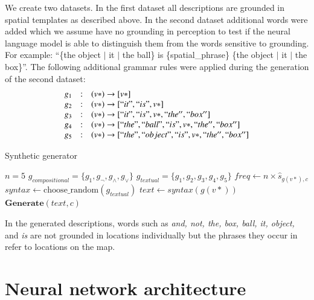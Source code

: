 We create two datasets. In the first dataset all descriptions are grounded in
spatial templates as described above. In the second dataset additional
words were added which we assume have no grounding in perception to test if the neural
language model is able to distinguish them from the words sensitive to grounding. For
example: ``\{the object $|$ it $|$ the ball\} is \{spatial\_phrase\} \{the
object $|$ it $|$ the box\}''. The following additional grammar rules
were applied during the generation of the second dataset:
\begin{equation}\label{iwcs2017:eq:grammar-rules}
\begin{array}{r c l}
g_1 &:& (v*) \to [v*] \\
g_2 &:& (v*) \to [``it", ``is", v*] \\
g_3 &:& (v*) \to [``it", ``is", v*, ``the'', ``box''] \\
g_4 &:& (v*) \to [``the", ``ball", ``is", v*, ``the'', ``box''] \\
g_5 &:& (v*) \to [``the", ``object", ``is", v*, ``the'', ``box''] \\
\end{array}
\end{equation}%
\begin{algorithm}
\caption{Synthetic generator}\label{iwcs2017:alg:generator}
\begin{algorithmic}[1]
\State $\textit{n} = 5$
\State $g_{compositional} = \{g_1, g_\neg, g_\land, g_\lor\}$
\State $g_{textual} = \{g_1, g_2, g_3, g_4, g_5\}$
\State $freq \gets n \times \hat{s}_{g(v*), c}$
\State $syntax \gets \mathrm{choose\_random}(g_{textual})$
\State $text \gets syntax(g(v*))$
\State $\mathbf{Generate}(text, c)$
\EndFor
\EndProcedure
\end{algorithmic}
\end{algorithm}
In the generated descriptions, words such as \textit{and, not, the, box, ball,
it, object,} and \textit{is} are not grounded in locations individually but the phrases they occur in refer to
locations on the map.

\section{Neural network architecture}\label{iwcs2017:sec:anns}

